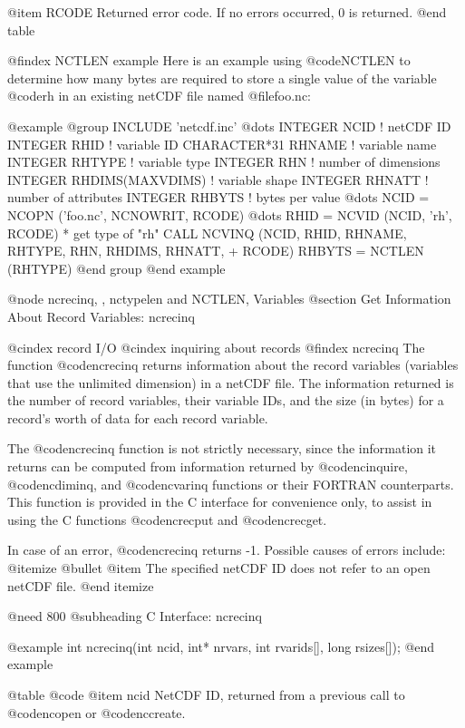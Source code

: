 @item RCODE
Returned error code.  If no errors occurred, 0 is returned.
@end table

@findex NCTLEN example
Here is an example using @code{NCTLEN} to determine how many bytes are
required to store a single value of the variable @code{rh} in an existing
netCDF file named @file{foo.nc}:

@example
@group
      INCLUDE 'netcdf.inc'
         @dots{}
      INTEGER  NCID              ! netCDF ID
      INTEGER  RHID               ! variable ID
      CHARACTER*31 RHNAME         ! variable name
      INTEGER  RHTYPE             ! variable type
      INTEGER  RHN                ! number of dimensions
      INTEGER  RHDIMS(MAXVDIMS)   ! variable shape
      INTEGER  RHNATT             ! number of attributes
      INTEGER  RHBYTS             ! bytes per value
         @dots{}
      NCID = NCOPN ('foo.nc', NCNOWRIT, RCODE)
         @dots{}
      RHID = NCVID (NCID, 'rh', RCODE)
* get type of "rh"
      CALL NCVINQ (NCID, RHID, RHNAME, RHTYPE, RHN, RHDIMS, RHNATT,
     +             RCODE)
      RHBYTS = NCTLEN (RHTYPE)
@end group
@end example

@node ncrecinq,  , nctypelen and NCTLEN, Variables
@section Get Information About Record Variables:  ncrecinq

@cindex record I/O
@cindex inquiring about records
@findex ncrecinq
The function @code{ncrecinq} returns information about the record
variables (variables that use the unlimited dimension) in a netCDF file.
The information returned is the number of record variables, their
variable IDs, and the size (in bytes) for a record's worth of data for
each record variable.

The @code{ncrecinq} function is not strictly necessary, since the
information it returns can be computed from information returned by
@code{ncinquire}, @code{ncdiminq}, and @code{ncvarinq} functions or
their FORTRAN counterparts.  This function is provided in the C
interface for convenience only, to assist in using the C functions
@code{ncrecput} and @code{ncrecget}.

In case of an error, @code{ncrecinq} returns -1.  Possible causes of
errors include:
@itemize @bullet
@item
The specified netCDF ID does not refer to an open netCDF file.
@end itemize

@need 800
@subheading C Interface:  ncrecinq

@example
int ncrecinq(int ncid, int* nrvars, int rvarids[], long rsizes[]);
@end example

@table @code
@item ncid
NetCDF ID, returned from a previous call to @code{ncopen} or @code{nccreate}.


